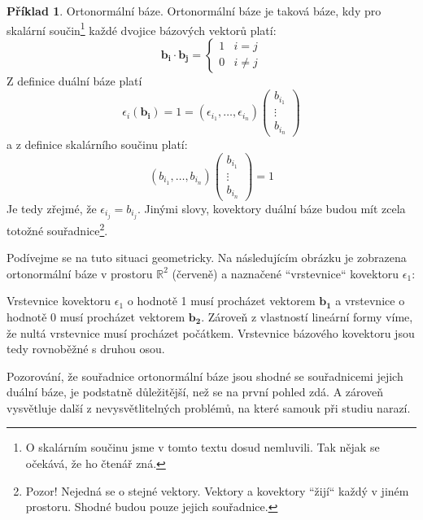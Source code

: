 \documentclass[a5paper,12pt]{amsbook}
\theoremstyle{definition}
\newtheorem{example}{Příklad}[chapter]
\newcommand{\myvec}[1]{\mathbf{#1}}
\newcommand{\mymap}[1]{#1}
\begin{document}
\begin{example}\label{example:covector1}Ortonormální báze. Ortonormální báze je taková báze,
kdy pro skalární součin\footnote{
  O skalárním součinu jsme v tomto textu dosud nemluvili. Tak nějak se očekává, že ho čtenář
  zná.
} každé dvojice bázových vektorů platí:
\begin{equation*}
\myvec{b_i}\cdot\myvec{b_j} = 
\begin{cases}
1 & i = j\\
0 & i \neq j
\end{cases}
\end{equation*}
Z definice duální báze platí
\begin{equation*}
\mymap{\epsilon_i}(\myvec{b_i}) = 1 = \left(\epsilon_{i_1}, \ldots, \epsilon_{i_n}\right)
\left(\begin{array}{c}
b_{i_1} \\
\vdots \\
b_{i_n}\end{array}\right)
\end{equation*}
a z definice skalárního součinu platí:
\begin{equation*}
\left(b_{i_1}, \ldots, b_{i_n}\right)
\left(\begin{array}{c}
b_{i_1} \\
\vdots \\
b_{i_n}\end{array}\right) = 1
\end{equation*}
Je tedy zřejmé, že $\epsilon_{i_j} = b_{i_j}$. Jinými slovy, kovektory duální báze budou mít
zcela totožné souřadnice\footnote{
  Pozor! Nejedná se o stejné vektory. Vektory a kovektory ``žijí`` každý v jiném prostoru.
  Shodné budou pouze jejich souřadnice.
}.

Podívejme se na tuto situaci geometricky. Na následujícím obrázku je zobrazena ortonormální
báze v prostoru $\mathbb{R}^2$ (červeně) a naznačené ``vrstevnice`` kovektoru $\mymap{\epsilon_1}$:
\begin{center}

\end{center}
Vrstevnice kovektoru $\mymap{\epsilon_1}$ o hodnotě 1 musí procházet vektorem $\myvec{b_1}$
a vrstevnice o hodnotě 0 musí procházet vektorem $\myvec{b_2}$. Zároveň z vlastností lineární
formy víme, že nultá vrstevnice musí procházet počátkem. Vrstevnice bázového kovektoru jsou
tedy rovnoběžné s druhou osou.

\medskip\noindent
Pozorování, že souřadnice ortonormální báze jsou shodné se souřadnicemi jejich duální báze,
je podstatně důležitější, než se na první pohled zdá. A zároveň vysvětluje další
z nevysvětlitelných problémů, na které samouk při studiu narazí.


\end{example}
\end{document}
